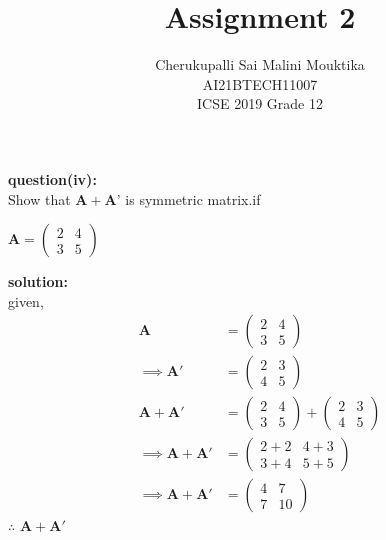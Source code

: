 \documentclass[12pt,two column]{article}
\title{Assignment 2}
\author{ Cherukupalli Sai Malini Mouktika\\\normalsize AI21BTECH11007 \\ \vspace*{10pt} \Large ICSE 2019 Grade 12}
\newcommand{\myvec}[1]{\ensuremath{\begin{pmatrix}#1\end{pmatrix}}}
\let\vec\mathbf
\begin{document}
\maketitle

\textbf{question(iv): }\\
Show that $\vec{A} + \vec{A’}$ is symmetric matrix.if

  $\vec{A} = \myvec{2 &  4 \\ 3 & 5}$

\textbf{solution: }\\
given,
\begin{align}
\vec{A} &= \myvec{2 &  4 \\ 3 & 5}\\
\implies
\vec{A'} &=\myvec{2 &  3 \\ 4 & 5}\\
\vec{A}+\vec{A'} &= \myvec{2 &  4 \\ 3 & 5}+\myvec{2 &  3 \\ 4 & 5}\\
\implies
\vec{A}+\vec{A'} &= \myvec{2+2 &  4+3 \\ 3+4 & 5+5}\\
\implies
\vec{A}+\vec{A'} &= \myvec{4 &  7 \\ 7 & 10}
\end{align}
$\therefore$ $\vec{A}+\vec{A'}$ 
\end{document}
